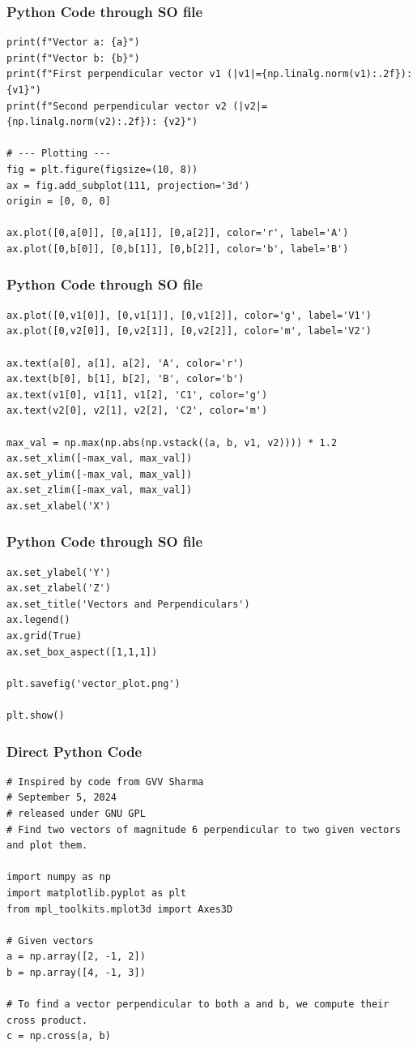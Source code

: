 \documentclass{beamer}
\begin{document}
\begin{frame}[fragile]
\frametitle{Python Code through SO file}
\begin{lstlisting}
print(f"Vector a: {a}")
print(f"Vector b: {b}")
print(f"First perpendicular vector v1 (|v1|={np.linalg.norm(v1):.2f}): {v1}")
print(f"Second perpendicular vector v2 (|v2|={np.linalg.norm(v2):.2f}): {v2}")

# --- Plotting ---
fig = plt.figure(figsize=(10, 8))
ax = fig.add_subplot(111, projection='3d')
origin = [0, 0, 0]

ax.plot([0,a[0]], [0,a[1]], [0,a[2]], color='r', label='A')
ax.plot([0,b[0]], [0,b[1]], [0,b[2]], color='b', label='B')
\end{lstlisting}
\end{frame}

\begin{frame}[fragile]
\frametitle{Python Code through SO file}
\begin{lstlisting}
ax.plot([0,v1[0]], [0,v1[1]], [0,v1[2]], color='g', label='V1')
ax.plot([0,v2[0]], [0,v2[1]], [0,v2[2]], color='m', label='V2')

ax.text(a[0], a[1], a[2], 'A', color='r')
ax.text(b[0], b[1], b[2], 'B', color='b')
ax.text(v1[0], v1[1], v1[2], 'C1', color='g')
ax.text(v2[0], v2[1], v2[2], 'C2', color='m')

max_val = np.max(np.abs(np.vstack((a, b, v1, v2)))) * 1.2
ax.set_xlim([-max_val, max_val])
ax.set_ylim([-max_val, max_val])
ax.set_zlim([-max_val, max_val])
ax.set_xlabel('X')
\end{lstlisting}
\end{frame}

\begin{frame}[fragile]
\frametitle{Python Code through SO file}
\begin{lstlisting}
ax.set_ylabel('Y')
ax.set_zlabel('Z')
ax.set_title('Vectors and Perpendiculars')
ax.legend()
ax.grid(True)
ax.set_box_aspect([1,1,1])

plt.savefig('vector_plot.png')

plt.show()
\end{lstlisting}
\end{frame}

\begin{frame}[fragile]
\frametitle{Direct Python Code}
\begin{lstlisting}
# Inspired by code from GVV Sharma
# September 5, 2024
# released under GNU GPL
# Find two vectors of magnitude 6 perpendicular to two given vectors and plot them.

import numpy as np
import matplotlib.pyplot as plt
from mpl_toolkits.mplot3d import Axes3D

# Given vectors
a = np.array([2, -1, 2])
b = np.array([4, -1, 3])

# To find a vector perpendicular to both a and b, we compute their cross product.
c = np.cross(a, b)
\end{lstlisting}
\end{frame}
\end{document}
